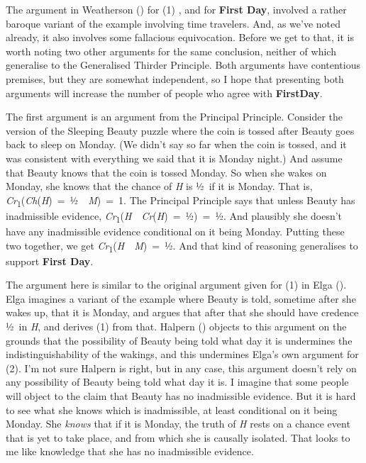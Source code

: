 \documentclass[
  10pt,
  letterpaper,
  DIV=11,
  numbers=noendperiod,
  twoside]{scrartcl}
\begin{document}
The argument in Weatherson () for
(1) , and for \textbf{First Day}, involved a rather baroque variant of
the example involving time travelers. And, as we've noted already, it
also involves some fallacious equivocation. Before we get to that, it is
worth noting two other arguments for the same conclusion, neither of
which generalise to the Generalised Thirder Principle. Both arguments
have contentious premises, but they are somewhat independent, so I hope
that presenting both arguments will increase the number of people who
agree with \textbf{FirstDay}.

The first argument is an argument from the Principal Principle. Consider
the version of the Sleeping Beauty puzzle where the coin is tossed after
Beauty goes back to sleep on Monday. (We didn't say so far when the coin
is tossed, and it was consistent with everything we said that it is
Monday night.) And assume that Beauty knows that the coin is tossed
Monday. So when she wakes on Monday, she knows that the chance of
\emph{H} is ½~if it is Monday. That is,
\emph{Cr}\textsubscript{1}(\emph{Ch}(\emph{H})~=~½~\textbar~\emph{M})~=~1.
The Principal Principle says that unless Beauty has inadmissible
evidence,
\emph{Cr}\textsubscript{1}(\emph{H}~\textbar~\emph{Cr}(\emph{H})~=~½)~=~½.
And plausibly she doesn't have any inadmissible evidence conditional on
it being Monday. Putting these two together, we get
\emph{Cr}\textsubscript{1}(\emph{H}~\textbar~\emph{M})~=~½. And that
kind of reasoning generalises to support \textbf{First Day}.

The argument here is similar to the original argument given for (1) in
Elga (). Elga imagines a variant of the
example where Beauty is told, sometime after she wakes up, that it is
Monday, and argues that after that she should have credence ½~in
\emph{H}, and derives (1) from that. Halpern
() objects to this argument on the
grounds that the possibility of Beauty being told what day it is
undermines the indistinguishability of the wakings, and this undermines
Elga's own argument for (2). I'm not sure Halpern is right, but in any
case, this argument doesn't rely on any possibility of Beauty being told
what day it is. I imagine that some people will object to the claim that
Beauty has no inadmissible evidence. But it is hard to see what she
knows which is inadmissible, at least conditional on it being Monday.
She \emph{knows} that if it is Monday, the truth of \emph{H} rests on a
chance event that is yet to take place, and from which she is causally
isolated. That looks to me like knowledge that she has no inadmissible
evidence.
\end{document}
